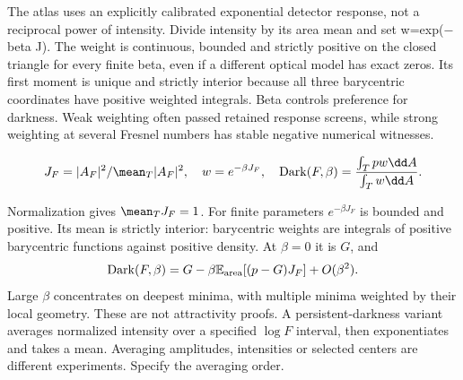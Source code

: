 \documentclass[11pt,oneside,openany]{book}
\begin{document}
The atlas uses an explicitly calibrated exponential detector response, not a reciprocal power of intensity. Divide intensity by its area mean and set w=exp(\ensuremath{-}beta J). The weight is continuous, bounded and strictly positive on the closed triangle for every finite beta, even if a different optical model has exact zeros. Its first moment is unique and strictly interior because all three barycentric coordinates have positive weighted integrals. Beta controls preference for darkness. Weak weighting often passed retained response screens, while strong weighting at several Fresnel numbers has stable negative numerical witnesses.


\[J_F=|A_F|^2/\mean_T|A_F|^2,\quad w=e^{-\beta J_F},\quad {\rm Dark}(F,\beta)=\frac{\int_Tpw\dd A}{\int_Tw\dd A}.\]



Normalization gives $\mean_TJ_F=1$.
For finite parameters $e^{-\beta J_F}$ is bounded and positive.
Its mean is strictly interior: barycentric weights are integrals
of positive barycentric functions against positive density.
At $\beta=0$ it is $G$, and
\[
\mathrm{Dark}(F,\beta)=G-\beta
\mathbb E_{\rm area}[(p-G)J_F]+O(\beta^2).
\]
Large $\beta$ concentrates on deepest minima, with multiple minima
weighted by their local geometry. These are not attractivity proofs.
A persistent-darkness variant averages normalized intensity over
a specified $\log F$ interval, then exponentiates and takes a mean.
Averaging amplitudes, intensities or selected centers are different
experiments. Specify the averaging order.
\end{document}

